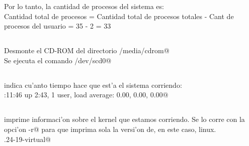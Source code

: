 			Por lo tanto, la cantidad de procesos del sistema es:\\
			Cantidad total de procesos = Cantidad total de procesos totales - Cant de procesos del usuario =  35 - 2 = 33
		\subsection{}
			Desmonte el CD-ROM del directorio \verb@umount /media/cdrom@\\
			Se ejecuta el comando \verb@umount /dev/scd0@
	  \subsection{}
		  \verb@uptime@ indica cu'anto tiempo hace que est'a el sistema corriendo:\\
		  :11:46 up  2:43,   1 user,   load average: 0.00, 0.00, 0.00@
	  \subsection{}
		  \verb@uname@ imprime informaci'on sobre el kernel que estamos corriendo. Se lo corre con la opci'on \verb@-r@ para que imprima sola la versi'on de, en este caso, linux.\\
		  .24-19-virtual@
